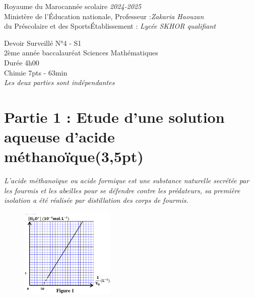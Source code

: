\documentclass[12pt]{article}
\newcommand\headerMe[2]{\noindent{}#1\hfill#2}
\begin{document}
\headerMe{Royaume du Maroc}{année scolaire \emph{2024-2025}}\\
\headerMe{Ministère de l'Éducation nationale, }{  Professeur :\emph{Zakaria Haouzan}}\\
\headerMe{du Préscolaire et des Sports}{Établissement : \emph{Lycée SKHOR qualifiant}}\\
\vspace{-1cm}
\begin{center}
Devoir Surveillé  N°4 - S1 \\
    2ème année baccalauréat Sciences Mathématiques\\
Durée 4h00
\\
    \vspace{-.2cm}
\hrulefill
\Large{Chimie 7pts - 63min}
\hrulefill\\

    \emph{Les deux parties sont indépendantes}
\end{center}

 \section*{Partie 1 : Etude d’une solution aqueuse d’acide méthanoïque\dotfill(3,5pt) }



\emph{L’acide méthanoïque ou acide formique est une substance naturelle secrétée par les fourmis et les abeilles
pour se défendre contre les prédateurs, sa première isolation a été réalisée par distillation des corps de
fourmis.}

\begin{figure}
  \begin{center}
	  \vspace{-1cm}
	\includegraphics[width=0.4\textwidth]{./img/chimie_fig.png}
  \end{center}
\end{figure}
\end{document}
